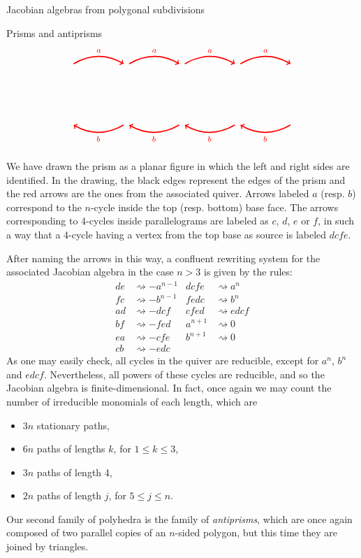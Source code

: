 \begin{chapter}{Jacobian algebras from polygonal subdivisions}
\begin{section}{Prisms and antiprisms}
\[\begin{tikzpicture}[text width=1.5mm, font=\footnotesize]
\foreach \x in {-4,-2,...,2}
{
\draw[->, red, very thick] (\x+0.1, 2.1) to [bend left] node[above]{$a$} (\x+1.9, 2.1);
\draw[<-, red, very thick] (\x+0.1, -0.1) to [bend right] node[below]{$b$} (\x+1.9, -0.1);
}
\end{tikzpicture}
\]

We have drawn the prism as a planar figure in which the left and right sides are identified. In the drawing, the black edges represent the edges of the prism and the red arrows are the ones from the associated quiver. Arrows labeled $a$ (resp. $b$) correspond to the $n$-cycle inside the top (resp. bottom) base face. The arrows corresponding to 4-cycles inside parallelograms are labeled as $c$, $d$, $e$ or $f$, in such a way that a 4-cycle having a vertex from the top base as source is labeled $dcfe$.

After naming the arrows in this way, a confluent rewriting system for the associated Jacobian algebra in the case $n>3$ is given by the rules:
\begin{align*}
de &\rightsquigarrow -a^{n-1} 	& dcfe &\rightsquigarrow a^n \\
fc &\rightsquigarrow -b^{n-1}	& fedc &\rightsquigarrow b^n \\
ad &\rightsquigarrow -dcf		& cfed &\rightsquigarrow edcf \\
bf &\rightsquigarrow -fed  	& a^{n+1} &\rightsquigarrow 0 \\
ea &\rightsquigarrow -cfe 		& b^{n+1} &\rightsquigarrow 0 \\
cb &\rightsquigarrow -edc  	& \, & \,
\end{align*}
As one may easily check, all cycles in the quiver are reducible, except for $a^n$, $b^n$ and $edcf$. Nevertheless, all powers of these cycles are reducible, and so the Jacobian algebra is finite-dimensional. In fact, once again we may count the number of irreducible monomials of each length, which are
\begin{itemize}
\item $3n$ stationary paths,
\item $6n$ paths of lengths $k$, for $1\leq k\leq 3$,
\item $3n$ paths of length 4,
\item $2n$ paths of length $j$, for $5\leq j\leq n$.
\end{itemize}

Our second family of polyhedra is the family of \emph{antiprisms}, which are once again composed of two parallel copies of an $n$-sided polygon, but this time they are joined by triangles.


\end{section}
\end{chapter}
